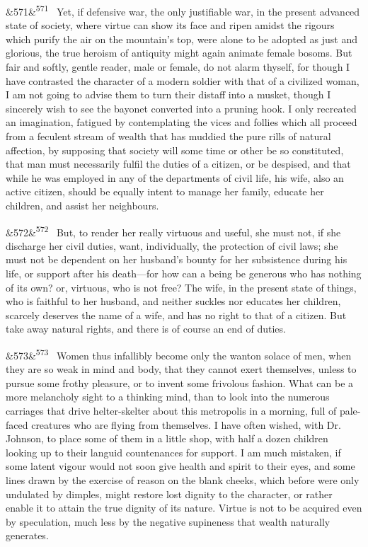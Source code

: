 \documentclass[12pt]{article}
\newcommand{\para}[1][]{\par\noindent\ifx&#1&\else\textsuperscript{\footnotesize #1}~\fi}
\begin{document}
\para[571] Yet, if defensive war, the only justifiable war, in the present advanced state of society, where virtue can show its face and ripen amidst the rigours which purify the air on the mountain's top, were alone to be adopted as just and glorious, the true heroism of antiquity might again animate female bosoms. But fair and softly, gentle reader, male or female, do not alarm thyself, for though I have contrasted the character of a modern soldier with that of a civilized woman, I am not going to advise them to turn their distaff into a musket, though I sincerely wish to see the bayonet converted into a pruning hook. I only recreated an imagination, fatigued by contemplating the vices and follies which all proceed from a feculent stream of wealth that has muddied the pure rills of natural affection, by supposing that society will some time or other be so constituted, that man must necessarily fulfil the duties of a citizen, or be despised, and that while he was employed in any of the departments of civil life, his wife, also an active citizen, should be equally intent to manage her family, educate her children, and assist her neighbours.

\para[572] But, to render her really virtuous and useful, she must not, if she discharge her civil duties, want, individually, the protection of civil laws; she must not be dependent on her husband's bounty for her subsistence during his life, or support after his death---for how can a being be generous who has nothing of its own? or, virtuous, who is not free? The wife, in the present state of things, who is faithful to her husband, and neither suckles nor educates her children, scarcely deserves the name of a wife, and has no right to that of a citizen. But take away natural rights, and there is of course an end of duties.

\para[573] Women thus infallibly become only the wanton solace of men, when they are so weak in mind and body, that they cannot exert themselves, unless to pursue some frothy pleasure, or to invent some frivolous fashion. What can be a more melancholy sight to a thinking mind, than to look into the numerous carriages that drive helter-skelter about this metropolis in a morning, full of pale-faced creatures who are flying from themselves. I have often wished, with Dr. Johnson, to place some of them in a little shop, with half a dozen children looking up to their languid countenances for support. I am much mistaken, if some latent vigour would not soon give health and spirit to their eyes, and some lines drawn by the exercise of reason on the blank cheeks, which before were only undulated by dimples, might restore lost dignity to the character, or rather enable it to attain the true dignity of its nature. Virtue is not to be acquired even by speculation, much less by the negative supineness that wealth naturally generates.
\end{document}
